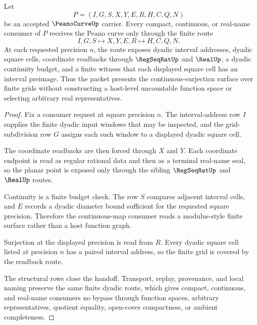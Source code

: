 \begin{theorem}
\label{thm:peano-curve-continuous-surjection-surface}
Let
$$
P=(I,G,S,X,Y,E,R,H,C,Q,N)
$$
be an accepted $\PeanoCurveUp$ carrier. Every compact, continuous, or real-name consumer of $P$ receives the Peano curve only through the finite route
$$
I,G,S \longmapsto X,Y,E,R \longmapsto H,C,Q,N .
$$
At each requested precision $n$, the route exposes dyadic interval addresses, dyadic square cells, coordinate readbacks through $\RegSeqRatUp$ and $\RealUp$, a dyadic continuity budget, and a finite witness that each displayed square cell has an interval preimage. Thus the packet presents the continuous-surjection surface over finite grids without constructing a host-level uncountable function space or selecting arbitrary real representatives.
\end{theorem}
\begin{proof}
Fix a consumer request at square precision $n$. The interval-address row $I$ supplies the finite dyadic input windows that may be inspected, and the grid-subdivision row $G$ assigns each such window to a displayed dyadic square cell.

The coordinate readbacks are then forced through $X$ and $Y$. Each coordinate endpoint is read as regular rational data and then as a terminal real-name seal, so the planar point is exposed only through the sibling $\RegSeqRatUp$ and $\RealUp$ routes.

Continuity is a finite budget check. The row $S$ compares adjacent interval cells, and $E$ records a dyadic diameter bound sufficient for the requested square precision. Therefore the continuous-map consumer reads a modulus-style finite surface rather than a host function graph.

Surjection at the displayed precision is read from $R$. Every dyadic square cell listed at precision $n$ has a paired interval address, so the finite grid is covered by the readback route.

The structural rows close the handoff. Transport, replay, provenance, and local naming preserve the same finite dyadic route, which gives compact, continuous, and real-name consumers no bypass through function spaces, arbitrary representatives, quotient equality, open-cover compactness, or ambient completeness.
\end{proof}

